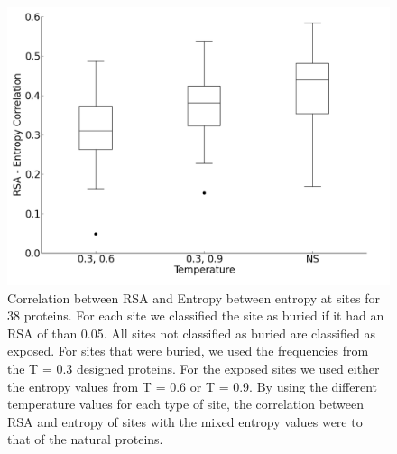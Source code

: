 \documentclass[12pt]{article}
\begin{document}
\begin{figure}[H]
\centerline{\includegraphics[width = 6in]{figures/Duncan_Mixed_Temp_Correlation_Plot.png}}
\caption{Correlation between RSA and Entropy between entropy at sites for 38 proteins. For each site we classified the site as buried if it had an RSA of than 0.05. All sites not classified as buried are classified as exposed. For sites that were buried, we used the frequencies from the T = 0.3 designed proteins. For the exposed sites we used either the entropy values from T = 0.6 or T = 0.9. By using the different temperature values for each type of site, the correlation between RSA and entropy of sites with the mixed entropy values were to that of the natural proteins.}
\label{Mixed_RSA_Entropy_Duncan}
\end{figure}
\end{document}
